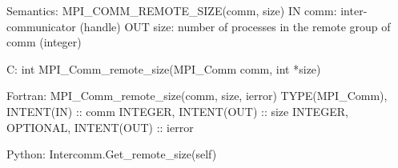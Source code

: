 Semantics:
MPI_COMM_REMOTE_SIZE(comm, size)
IN comm: inter-communicator (handle)
OUT size: number of processes in the remote group of comm (integer)

C:
int MPI_Comm_remote_size(MPI_Comm comm, int *size)

Fortran:
MPI_Comm_remote_size(comm, size, ierror)
TYPE(MPI_Comm), INTENT(IN) ::  comm
INTEGER, INTENT(OUT) ::  size
INTEGER, OPTIONAL, INTENT(OUT) ::  ierror

Python:
Intercomm.Get_remote_size(self)
